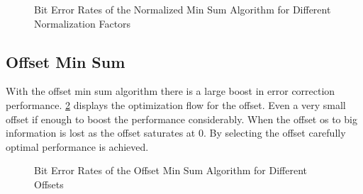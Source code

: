 \begin{figure}
    \centering
    \label{min_sum_norm_opt}
    \caption{Bit Error Rates of the Normalized Min Sum Algorithm for Different Normalization Factors}
\end{figure}

\subsection{Offset Min Sum}
With the offset min sum algorithm there is a large boost in error correction performance. \cref{min_sum_offset_opt} displays the optimization flow for the offset. Even a very small offset if enough to boost the performance considerably. When the offset os to big information is lost as the offset saturates at 0. By selecting the offset carefully optimal performance is achieved.
\begin{figure}
    \centering
    \label{min_sum_offset_opt}
    \caption{Bit Error Rates of the Offset Min Sum Algorithm for Different Offsets}
\end{figure}

